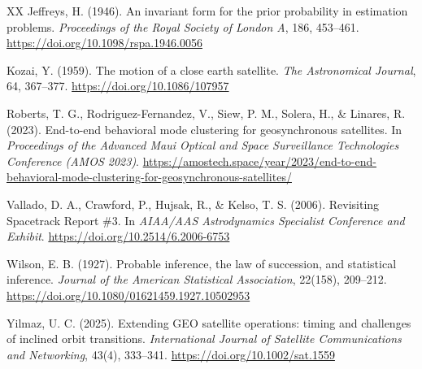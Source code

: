 \documentclass[11pt]{article}
\begin{document}
\begin{thebibliography}{XX}
 Jeffreys, H. (1946). An invariant form for the prior probability in estimation problems. \emph{Proceedings of the Royal Society of London A}, 186, 453--461. \url{https://doi.org/10.1098/rspa.1946.0056}

 Kozai, Y. (1959). The motion of a close earth satellite. \emph{The Astronomical Journal}, 64, 367--377. \url{https://doi.org/10.1086/107957}

 Roberts, T. G., Rodriguez-Fernandez, V., Siew, P. M., Solera, H., \& Linares, R. (2023). End-to-end behavioral mode clustering for geosynchronous satellites. In \emph{Proceedings of the Advanced Maui Optical and Space Surveillance Technologies Conference (AMOS 2023)}. \url{https://amostech.space/year/2023/end-to-end-behavioral-mode-clustering-for-geosynchronous-satellites/}

 Vallado, D. A., Crawford, P., Hujsak, R., \& Kelso, T. S. (2006). Revisiting Spacetrack Report \#3. In \emph{AIAA/AAS Astrodynamics Specialist Conference and Exhibit}. \url{https://doi.org/10.2514/6.2006-6753}

 Wilson, E. B. (1927). Probable inference, the law of succession, and statistical inference. \emph{Journal of the American Statistical Association}, 22(158), 209--212. \url{https://doi.org/10.1080/01621459.1927.10502953}

 Yilmaz, U. C. (2025). Extending GEO satellite operations: timing and challenges of inclined orbit transitions. \emph{International Journal of Satellite Communications and Networking}, 43(4), 333--341. \url{https://doi.org/10.1002/sat.1559}


\end{thebibliography}
\end{document}
